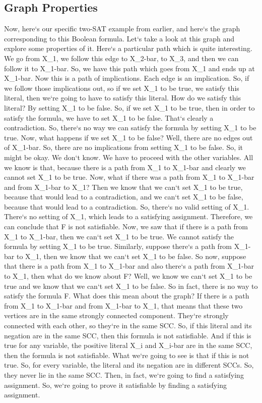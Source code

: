 \subsection{Graph Properties}
Now, here`s our specific two-SAT example from earlier, and here`s the graph corresponding to this Boolean formula.
Let`s take a look at this graph and explore some properties of it.
Here`s a particular path which is quite interesting.
We go from X\_1, we follow this edge to X\_2-bar, to X\_3, and then we can follow it to X\_1-bar.
So, we have this path which goes from X\_1 and ends up at X\_1-bar.
Now this is a path of implications.
Each edge is an implication.
So, if we follow those implications out, so if we set X\_1 to be true, we satisfy this literal, then we`re going to have to satisfy this literal.
How do we satisfy this literal? By setting X\_1 to be false.
So, if we set X\_1 to be true, then in order to satisfy the formula, we have to set X\_1 to be false.
That`s clearly a contradiction.
So, there`s no way we can satisfy the formula by setting X\_1 to be true.
Now, what happens if we set X\_1 to be false? Well, there are no edges out of X\_1-bar.
So, there are no implications from setting X\_1 to be false.
So, it might be okay.
We don`t know.
We have to proceed with the other variables.
All we know is that, because there is a path from X\_1 to X\_1-bar and clearly we cannot set X\_1 to be true.
Now, what if there was a path from X\_1 to X\_1-bar and from X\_1-bar to X\_1? Then we know that we can`t set X\_1 to be true, because that would lead to a contradiction, and we can`t set X\_1 to be false, because that would lead to a contradiction.
So, there`s no valid setting of X\_1.
There`s no setting of X\_1, which leads to a satisfying assignment.
Therefore, we can conclude that F is not satisfiable.
Now, we saw that if there is a path from X\_1 to X\_1-bar, then we can`t set X\_1 to be true.
We cannot satisfy the formula by setting X\_1 to be true.
Similarly, suppose there`s a path from X\_1-bar to X\_1, then we know that we can`t set X\_1 to be false.
So now, suppose that there is a path from X\_1 to X\_1-bar and also there`s a path from X\_1-bar to X\_1, then what do we know about F? Well, we know we can`t set X\_1 to be true and we know that we can`t set X\_1 to be false.
So in fact, there is no way to satisfy the formula F\@.
What does this mean about the graph? If there is a path from X\_1 to X\_1-bar and from X\_1-bar to X\_1, that means that these two vertices are in the same strongly connected component.
They`re strongly connected with each other, so they`re in the same SCC\@.
So, if this literal and its negation are in the same SCC, then this formula is not satisfiable.
And if this is true for any variable, the positive literal X\_i and X\_i-bar are in the same SCC, then the formula is not satisfiable.
What we`re going to see is that if this is not true.
So, for every variable, the literal and its negation are in different SCCs.
So, they never lie in the same SCC\@.
Then, in fact, we`re going to find a satisfying assignment.
So, we`re going to prove it satisfiable by finding a satisfying assignment.

